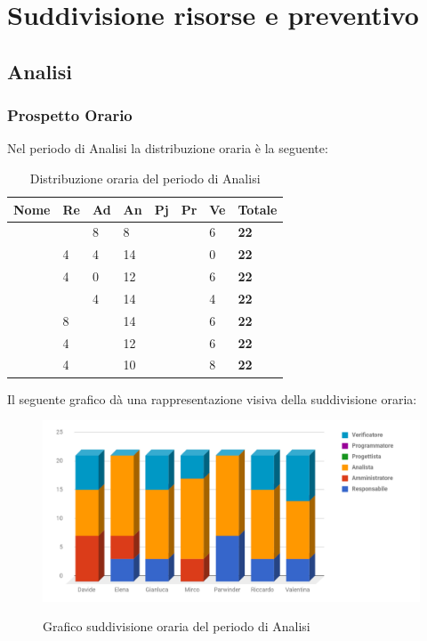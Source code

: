 \documentclass[PianoDiProgetto.tex]{subfiles}
\begin{document}
\chapter{Suddivisione risorse e preventivo}
\section{Analisi}
\subsection{Prospetto Orario}
Nel periodo di Analisi la distribuzione oraria è la seguente:
\begin{center}

\begin{table}[htbp]
	\centering
	\renewcommand\arraystretch{1.5}
	\begin{tabularx}{\textwidth}{p{4cm}|p{1cm}|p{1cm}|p{1cm}|p{1cm}|p{1cm}|p{1cm}|p{2cm}}
		\hline
		\textbf{Nome} & \textbf{Re} & \textbf{Ad} & \textbf{An} & \textbf{Pj} & \textbf{Pr} & \textbf{Ve} & \textbf{Totale} \\
		\hline
		\Davide & \ & 8 & 8 & \ & \ & 6 & \textbf{22} \\
		\hline
		\Elena & 4 & 4 & 14 & \ & \ & 0 & \textbf{22} \\
		\hline
		\Gianluca & 4 & 0 & 12 & \ & \ & 6 & \textbf{22} \\
		\hline
		\Mirco & \ & 4 & 14 & \ & \ & 4 & \textbf{22} \\
		\hline
		\Parwinder & 8 & \ & 14 & \ & \ & 6 & \textbf{22} \\
		\hline
		\Riccardo & 4 & \ & 12 & \ & \ & 6 & \textbf{22} \\
		\hline
		\Valentina & 4 & \ & 10 & \ & \ & 8 & \textbf{22} \\
		\hline
	\end{tabularx}
	\caption{Distribuzione oraria del periodo di Analisi}
	\label{my-label}
\end{table} 
\newpage	
\end{center}
Il seguente grafico dà una rappresentazione visiva della suddivisione oraria:
\begin{figure}[h]
	\includegraphics[width=14.5cm]{images/prospettoOrario/analisi.png}
	\label{fig:foo}
	\caption{Grafico suddivisione oraria del periodo di Analisi}
\end{figure} 
\end{document}
